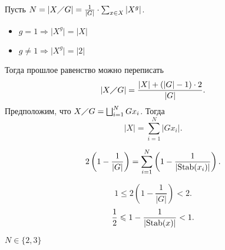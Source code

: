 \documentclass[11pt,dvipsnames]{article}
\begin{document}
Пусть $ N = \left| X \diagup G \right| = \frac{1}{\lvert G \rvert }\cdot \sum_{x \in X}^{}|X^{g}|  $.
\begin{itemize}[noitemsep]
    \item $ g = 1 \Longrightarrow \lvert X^{g} \rvert = \lvert X \rvert $
    \item $ g \ne 1 \Longrightarrow \lvert X^{g} \rvert  = \lvert 2 \rvert $
\end{itemize}
Тогда прошлое равенство можно переписать
\[
    \lvert X \diagup G \rvert  = \frac{\lvert X \rvert + (\lvert G \rvert  -1)\cdot 2}{\lvert G \rvert } 
.\] 
Предположим, что $ X \diagup G = \bigsqcup_{i = 1}^{N} Gx_i$. Тогда 
\[
\lvert X \rvert  = \sum_{i=1}^{N} |Gx_i|
.\] 
\begin{thm}
    \[
	2\left( 1- \frac{1}{\lvert G \rvert } \right)  = \sum_{i=1}^{N} \left( 1 - \frac{1}{\lvert {\mathop{\text{\rm Stab}}}(x_{i}) \rvert } \right) 
    .\] 
\end{thm}
\begin{st}
     \[
	 1 \le  2 \left(1-\frac{1}{\lvert G \rvert }\right) < 2
    .\] 
    \[
	\frac{1}{2 } \leqslant 1 -\frac{1}{\lvert {\mathop{\text{\rm Stab}}} (x) \rvert } < 1
    .\] 
\end{st}
\begin{st}
    $ N \in \{2, 3\}$
\end{st}
\end{document}
